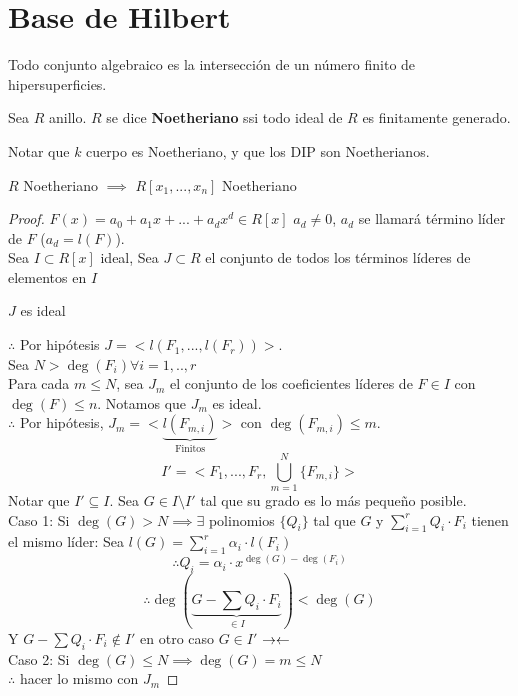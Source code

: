\section{Base de Hilbert}

\begin{thm}
    Todo conjunto algebraico es la intersección de un número finito de hipersuperficies.
\end{thm}

\begin{defn}
    Sea $R$ anillo. $R$ se dice \textbf{Noetheriano} ssi todo ideal de $R$ es finitamente generado.
\end{defn}

\begin{obs}
    Notar que $k$ cuerpo es Noetheriano, y que los DIP son Noetherianos.
\end{obs}

\begin{thm}[Hilbert]
    $R$ Noetheriano $\implies$ $R[x_1,...,x_n]$ Noetheriano
\end{thm}

\begin{proof}
    $F(x)=a_0+a_1x+...+a_dx^d\in R[x]$ $a_d\neq 0$, $a_d$ se llamará término líder de $F$ ($a_d=l(F)$).\\
    Sea $I\subset R[x]$ ideal, Sea $J\subset R$ el conjunto de todos los términos líderes de elementos en $I$
    \begin{obs}
        $J$ es ideal
    \end{obs}
    \noindent$\therefore$ Por hipótesis $J=<l(F_1,...,l(F_r))>$.\\
    Sea $N>\deg(F_i)\forall i=1,..,r$\\
    Para cada $m\leq N$, sea $J_m$ el conjunto de los coeficientes líderes de $F\in I$ con $\deg(F)\leq n$. Notamos que $J_m$ es ideal.\\
    $\therefore$ Por hipótesis, $J_m=<\underbrace{l(F_{m,i})}_\text{Finitos}>$ con $\deg(F_{m,i})\leq m$.\\
    \[
        I'=<F_1,...,F_r,\bigcup_{m=1}^N\{F_{m,i}\}>
    \]
    Notar que $I'\subseteq I$. Sea $G\in I\setminus I'$ tal que su grado es lo más pequeño posible.\\
    Caso 1: Si $\deg(G)>N\implies\exists$ polinomios $\{Q_i\}$ tal que $G$ y $\sum_{i=1}^rQ_i\cdot F_i$ tienen el mismo líder: Sea $l(G)=\sum_{i=1}^r\alpha_i\cdot l(F_i)$
    \[
        \therefore Q_i=\alpha_i\cdot x^{\deg(G)-\deg(F_i)}
    \]
    \[
        \therefore \deg(\underbrace{G-\sum Q_i\cdot F_i}_{\in I})<\deg(G)
    \]
    Y $G-\sum Q_i\cdot F_i\notin I'$ en otro caso $G\in I'$ $\rightarrow\leftarrow$\\
    Caso 2: Si $\deg(G)\leq N\implies \deg(G)=m\leq N$\\
    $\therefore$ hacer lo mismo con $J_m$
\end{proof}

